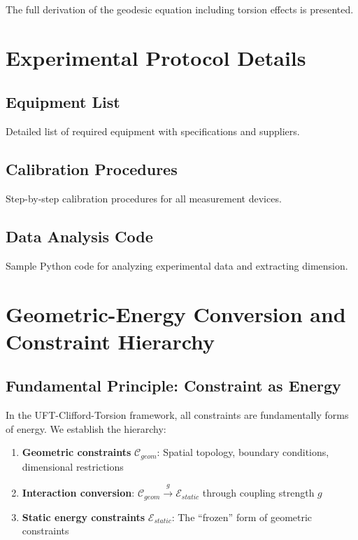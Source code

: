 \documentclass[12pt,a4paper]{article}
\begin{document}
The full derivation of the geodesic equation including torsion effects is presented.

\section{Experimental Protocol Details}
\label{app:protocol}

\subsection{Equipment List}

Detailed list of required equipment with specifications and suppliers.

\subsection{Calibration Procedures}

Step-by-step calibration procedures for all measurement devices.

\subsection{Data Analysis Code}

Sample Python code for analyzing experimental data and extracting dimension.

\section{Geometric-Energy Conversion and Constraint Hierarchy}
\label{app:geometric_energy}

\subsection{Fundamental Principle: Constraint as Energy}

In the UFT-Clifford-Torsion framework, all constraints are fundamentally forms of energy. We establish the hierarchy:
\begin{enumerate}
    \item \textbf{Geometric constraints} $\mathcal{C}_{geom}$: Spatial topology, boundary conditions, dimensional restrictions
    \item \textbf{Interaction conversion}: $\mathcal{C}_{geom} \xrightarrow{g} \mathcal{E}_{static}$ through coupling strength $g$
    \item \textbf{Static energy constraints} $\mathcal{E}_{static}$: The ``frozen'' form of geometric constraints
\end{enumerate}
\end{document}
